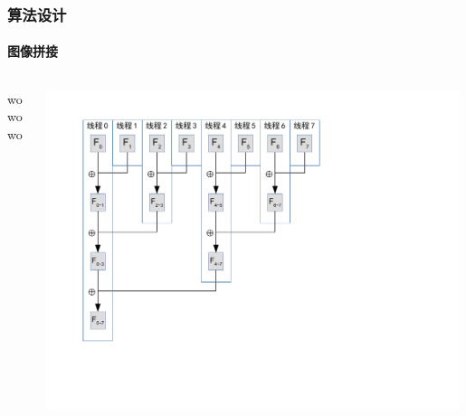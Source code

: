 \documentclass{beamer}
\begin{document}
\begin{frame}
    \frametitle{算法设计}
    \framesubtitle{图像拼接}

    \begin{columns}
        \begin{column}{0.5\textwidth}
            wowowo
        \end{column}
        \begin{column}{0.5\textwidth}
            \includegraphics[width=0.99\textwidth]{figures/reduce.pdf}
        \end{column}
    \end{columns}
\end{frame}
\end{document}
